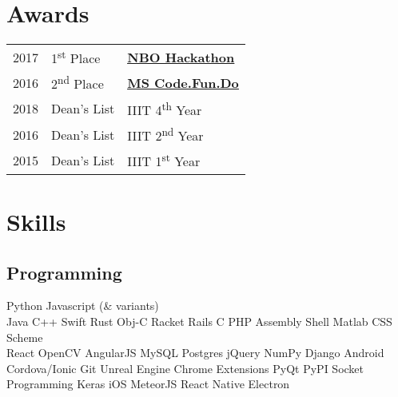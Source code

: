 \documentclass[]{deedy-resume-openfont}
\begin{document}
\begin{minipage}[t]{0.33\textwidth}
\section{Awards} 
\begin{tabular}{@{}lll}
2017	     & 1\textsuperscript{st} Place  & \textbf{\underline{\href{https://www.nbo.om/en/Pages/Competitions/NBO-Hackathon.aspx}{NBO Hackathon}}}\\
2016	     & 2\textsuperscript{nd} Place & \textbf{\underline{\href{https://www.acadaccelerator.com/}{MS Code.Fun.Do}}}\\
2018         & Dean's List  & IIIT 4\textsuperscript{th} Year\\
2016	     & Dean's List  & IIIT 2\textsuperscript{nd} Year\\
2015	     & Dean's List  & IIIT 1\textsuperscript{st} Year\\

\end{tabular}
\sectionsep


\section{Skills}
\subsection{Programming}
 Python \textbullet{} Javascript (\& variants) \\
Java \textbullet{} C++
\textbullet{} Swift 
\textbullet{} Rust 
\textbullet{} Obj-C
 \textbullet{} Racket \textbullet{} Rails \textbullet{} C \textbullet{} PHP \textbullet{} Assembly  \textbullet{} Shell \textbullet{} Matlab \textbullet{} CSS
\textbullet{} Scheme   \\
React \textbullet{} OpenCV \textbullet{} AngularJS \textbullet{} MySQL \textbullet{} Postgres \textbullet jQuery \textbullet{} NumPy \textbullet{} Django \textbullet{} Android
\textbullet{} Cordova/Ionic \textbullet{} Git \textbullet{} Unreal Engine
\textbullet{} Chrome Extensions \textbullet{} PyQt \textbullet{} PyPI \textbullet{} Socket Programming \textbullet{} Keras \textbullet{} iOS \textbullet{} MeteorJS \textbullet{} React Native  \textbullet{} Electron
\sectionsep



\end{minipage}
\end{document}
